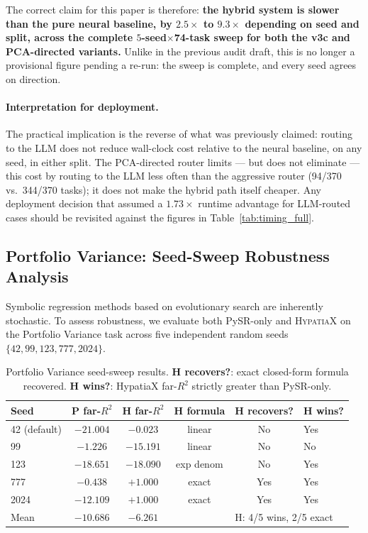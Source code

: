 \documentclass[twoside,11pt]{article}
\newcommand{\Rsq}{R^{2}}
\begin{document}
The correct claim for this paper is therefore: \textbf{the hybrid system
is slower than the pure neural baseline, by $2.5\times$ to $9.3\times$
depending on seed and split, across the complete $5$-seed$\times$74-task
sweep for both the v3c and PCA-directed variants.} Unlike in the previous
audit draft, this is no longer a provisional figure pending a re-run: the
sweep is complete, and every seed agrees on direction.

\paragraph{Interpretation for deployment.}
The practical implication is the reverse of what was previously claimed:
routing to the LLM does not reduce wall-clock cost relative to the neural
baseline, on any seed, in either split. The PCA-directed router limits
--- but does not eliminate --- this cost by routing to the LLM less often
than the aggressive router (94/370 vs.\ 344/370 tasks); it does not make
the hybrid path itself cheaper. Any deployment decision that assumed a
$1.73\times$ runtime advantage for LLM-routed cases should be revisited
against the figures in Table~\ref{tab:timing_full}.

\subsection{Portfolio Variance: Seed-Sweep Robustness Analysis}\label{subsec:portfolio-variance-seedsweep-robustness-}
\label{sec:portfolio_seed_sweep}

Symbolic regression methods based on evolutionary search are inherently stochastic.
To assess robustness, we evaluate both PySR-only and \textsc{HypatiaX} on the
Portfolio Variance task across five independent random seeds
$\{42, 99, 123, 777, 2024\}$.

\begin{table}[h]
\centering
\caption{Portfolio Variance seed-sweep results.
  \textbf{H recovers?}: exact closed-form formula recovered.
  \textbf{H wins?}: HypatiaX far-$\Rsq$ strictly greater than PySR-only.}
\label{tab:portfolio_seed_sweep}
\small
\begin{tabular}{lccccl}
\toprule
\textbf{Seed} & \textbf{P far-$\Rsq$} & \textbf{H far-$\Rsq$} &
\textbf{H formula} & \textbf{H recovers?} & \textbf{H wins?} \\
\midrule
42 (default) & $-21.004$ & $-0.023$  & linear    & No  & Yes \\
99           & $-1.226$  & $-15.191$ & linear    & No  & No  \\
123          & $-18.651$ & $-18.090$ & exp denom & No  & Yes \\
777          & $-0.438$  & $+1.000$  & exact     & Yes & Yes \\
2024         & $-12.109$ & $+1.000$  & exact     & Yes & Yes \\
\midrule
Mean         & $-10.686$ & $-6.261$  &           & \multicolumn{2}{l}{H: 4/5 wins, 2/5 exact} \\
\bottomrule
\end{tabular}
\end{table}
\end{document}
